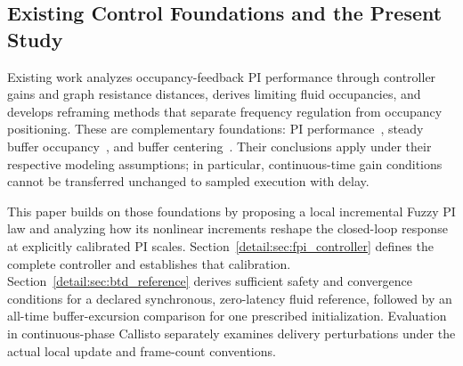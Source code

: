 \subsection{Existing Control Foundations and the Present Study}

Existing work analyzes occupancy-feedback PI performance through controller gains and graph resistance distances, derives limiting fluid occupancies, and develops reframing methods that separate frequency regulation from occupancy positioning. These are complementary foundations: PI performance~\cite{lall2022resistance}, steady buffer occupancy~\cite{lall2024bufferOccupancy}, and buffer centering~\cite{lall2023bufferCentering}. Their conclusions apply under their respective modeling assumptions; in particular, continuous-time gain conditions cannot be transferred unchanged to sampled execution with delay.

This paper builds on those foundations by proposing a local incremental Fuzzy PI law and analyzing how its nonlinear increments reshape the closed-loop response at explicitly calibrated PI scales. Section~\ref{detail:sec:fpi_controller} defines the complete controller and establishes that calibration. Section~\ref{detail:sec:btd_reference} derives sufficient safety and convergence conditions for a declared synchronous, zero-latency fluid reference, followed by an all-time buffer-excursion comparison for one prescribed initialization. Evaluation in continuous-phase Callisto separately examines delivery perturbations under the actual local update and frame-count conventions.
